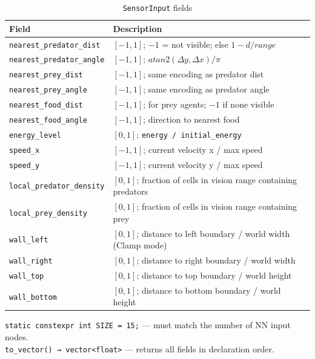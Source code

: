 \begin{table}[H]
\centering\small
\caption{\texttt{SensorInput} fields}
\begin{tabularx}{\textwidth}{@{}lX@{}}
\toprule
\textbf{Field} & \textbf{Description} \\
\midrule
\texttt{nearest\_predator\_dist}    & $[-1, 1]$; $-1$ = not visible; else $1 - d/\mathit{range}$ \\
\texttt{nearest\_predator\_angle}   & $[-1, 1]$; $\mathit{atan2}(\Delta y, \Delta x)/\pi$ \\
\texttt{nearest\_prey\_dist}        & $[-1, 1]$; same encoding as predator dist \\
\texttt{nearest\_prey\_angle}       & $[-1, 1]$; same encoding as predator angle \\
\texttt{nearest\_food\_dist}        & $[-1, 1]$; for prey agents; $-1$ if none visible \\
\texttt{nearest\_food\_angle}       & $[-1, 1]$; direction to nearest food \\
\texttt{energy\_level}              & $[0, 1]$; \texttt{energy / initial\_energy} \\
\texttt{speed\_x}                   & $[-1, 1]$; current velocity x / max speed \\
\texttt{speed\_y}                   & $[-1, 1]$; current velocity y / max speed \\
\texttt{local\_predator\_density}   & $[0, 1]$; fraction of cells in vision range containing predators \\
\texttt{local\_prey\_density}       & $[0, 1]$; fraction of cells in vision range containing prey \\
\texttt{wall\_left}                 & $[0, 1]$; distance to left boundary / world width (Clamp mode) \\
\texttt{wall\_right}                & $[0, 1]$; distance to right boundary / world width \\
\texttt{wall\_top}                  & $[0, 1]$; distance to top boundary / world height \\
\texttt{wall\_bottom}               & $[0, 1]$; distance to bottom boundary / world height \\
\bottomrule
\end{tabularx}
\end{table}

\texttt{static constexpr int SIZE = 15;} — must match the number of NN input nodes.\\
\texttt{to\_vector() → vector<float>} — returns all fields in declaration order.

